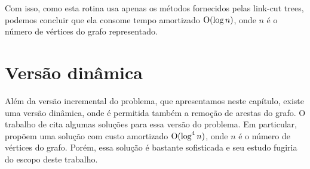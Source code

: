 Com isso, como esta rotina usa apenas os métodos fornecidos pelas link-cut trees, podemos concluir que ela consome tempo amortizado $\mathrm{O}(\log n)$, onde $n$ é o número de vértices do grafo representado.

\section{Versão dinâmica}
\label{sec:versao-dinamica}

Além da versão incremental do problema, que apresentamos neste capítulo, existe uma versão dinâmica, onde é permitida também a remoção de arestas do grafo. O trabalho de \citet{hanauer2021recent} cita algumas soluções para essa versão do problema. Em particular, \citet{10.1145/502090.502095} propõem uma solução com custo amortizado $\mathrm{O}(\log^4 n)$, onde $n$ é o número de vértices do grafo. Porém, essa solução é bastante sofisticada e seu estudo fugiria do escopo deste trabalho.